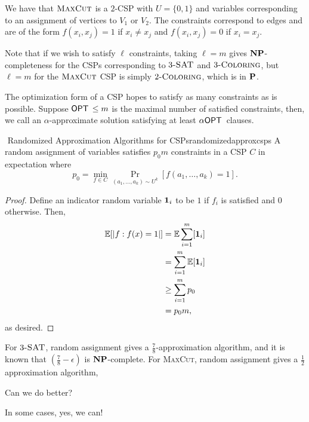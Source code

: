         \begin{example}
            We have that \(\textsc{MaxCut}\) is a \(2\)-CSP with \(U=\{0,1\}\) and variables corresponding to an assignment of vertices to \(V_1\) or \(V_2\). The constraints correspond to edges and are of the form \(f(x_i,x_j)=1\) if \(x_i\neq x_j\) and \(f(x_i,x_j)=0\) if \(x_i=x_j\).
        \end{example}
        \begin{remark*}
            Note that if we wish to satisfy \(\ell\) constraints, taking \(\ell=m\) gives \(\mathbf{NP}\)-completeness for the CSPs corresponding to \(3\textsc{-SAT}\) and \(3\textsc{-Coloring}\), but \(\ell=m\) for the \(\textsc{MaxCut}\) CSP is simply \(2\textsc{-Coloring}\), which is in \(\mathbf{P}\).
        \end{remark*}
        \begin{remark*}
            The optimization form of a CSP hopes to satisfy as many constraints as is possible. Suppose \(\mathsf{OPT\,}\leq m\) is the maximal number of satisfied constraints, then, we call an \(\alpha\)-approximate solution satisfying at least \(\alpha\mathsf{OPT\,}\) clauses.
        \end{remark*}
        \pagebreak
        \begin{theorem}{\Stop\,\,Randomized Approximation Algorithms for CSPs}{randomizedapproxcsps}
            A random assignment of variables satisfies \(p_0m\) constraints in a CSP \(C\) in expectation where
            \begin{equation*}
                p_0=\min_{f\in C}\Pr_{(a_1,\ldots,a_k)\sim U^k}[f(a_1,\ldots,a_k)=1].
            \end{equation*}
            \begin{proof}
                Define an indicator random variable \(\mathbf{1}_i\) to be \(1\) if \(f_i\) is satisfied and \(0\) otherwise. Then,
                \begin{align*}
                    \mathbb{E}[|f:f(x)=1|]&=\mathbb{E}\sum_{i=1}^m[\mathbf{1}_i] \\
                    &=\sum_{i=1}^m\mathbb{E}[\mathbf{1}_i] \\
                    &\geq \sum_{i=1}^m p_0 \\
                    &=p_0m,
                \end{align*}
                as desired.
            \end{proof}
        \end{theorem}
        \begin{remark*}
            For \(3\textsc{-SAT}\), random assignment gives a \(\frac{7}{8}\)-approximation algorithm, and it is known that \(\left(\frac{7}{8}-\epsilon\right)\) is \(\mathbf{NP}\)-complete. For \textsc{MaxCut}, random assignment gives a \(\frac{1}{2}\) approximation algorithm, 
        \end{remark*}
        \begin{question*}
            Can we do better?
        \end{question*}
        \begin{answer*}
            In some cases, yes, we can!
        \end{answer*}